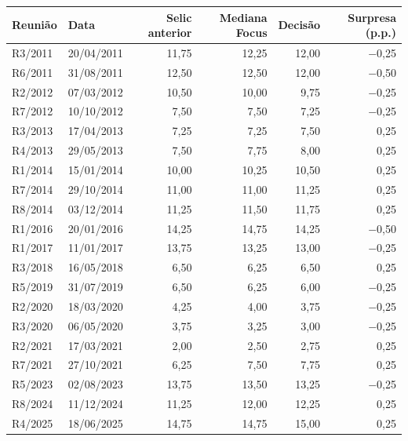 \begin{tabular}{llrrrr}
\toprule
Reunião & Data & Selic anterior & Mediana Focus & Decisão & Surpresa (p.p.) \\
\midrule
R3/2011 & 20/04/2011 & 11{,}75 & 12{,}25 & 12{,}00 & \ensuremath{-}0{,}25 \\
R6/2011 & 31/08/2011 & 12{,}50 & 12{,}50 & 12{,}00 & \ensuremath{-}0{,}50 \\
R2/2012 & 07/03/2012 & 10{,}50 & 10{,}00 & 9{,}75 & \ensuremath{-}0{,}25 \\
R7/2012 & 10/10/2012 & 7{,}50 & 7{,}50 & 7{,}25 & \ensuremath{-}0{,}25 \\
R3/2013 & 17/04/2013 & 7{,}25 & 7{,}25 & 7{,}50 & 0{,}25 \\
R4/2013 & 29/05/2013 & 7{,}50 & 7{,}75 & 8{,}00 & 0{,}25 \\
R1/2014 & 15/01/2014 & 10{,}00 & 10{,}25 & 10{,}50 & 0{,}25 \\
R7/2014 & 29/10/2014 & 11{,}00 & 11{,}00 & 11{,}25 & 0{,}25 \\
R8/2014 & 03/12/2014 & 11{,}25 & 11{,}50 & 11{,}75 & 0{,}25 \\
R1/2016 & 20/01/2016 & 14{,}25 & 14{,}75 & 14{,}25 & \ensuremath{-}0{,}50 \\
R1/2017 & 11/01/2017 & 13{,}75 & 13{,}25 & 13{,}00 & \ensuremath{-}0{,}25 \\
R3/2018 & 16/05/2018 & 6{,}50 & 6{,}25 & 6{,}50 & 0{,}25 \\
R5/2019 & 31/07/2019 & 6{,}50 & 6{,}25 & 6{,}00 & \ensuremath{-}0{,}25 \\
R2/2020 & 18/03/2020 & 4{,}25 & 4{,}00 & 3{,}75 & \ensuremath{-}0{,}25 \\
R3/2020 & 06/05/2020 & 3{,}75 & 3{,}25 & 3{,}00 & \ensuremath{-}0{,}25 \\
R2/2021 & 17/03/2021 & 2{,}00 & 2{,}50 & 2{,}75 & 0{,}25 \\
R7/2021 & 27/10/2021 & 6{,}25 & 7{,}50 & 7{,}75 & 0{,}25 \\
R5/2023 & 02/08/2023 & 13{,}75 & 13{,}50 & 13{,}25 & \ensuremath{-}0{,}25 \\
R8/2024 & 11/12/2024 & 11{,}25 & 12{,}00 & 12{,}25 & 0{,}25 \\
R4/2025 & 18/06/2025 & 14{,}75 & 14{,}75 & 15{,}00 & 0{,}25 \\
\bottomrule
\end{tabular}
